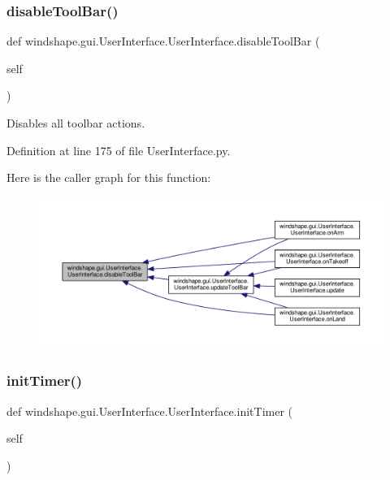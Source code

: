 \subsubsection{\texorpdfstring{disable\+Tool\+Bar()}{disableToolBar()}}
{\footnotesize\ttfamily def windshape.\+gui.\+User\+Interface.\+User\+Interface.\+disable\+Tool\+Bar (\begin{DoxyParamCaption}\item[{}]{self }\end{DoxyParamCaption})}

\begin{DoxyVerb}Disables all toolbar actions.\end{DoxyVerb}
 

Definition at line 175 of file User\+Interface.\+py.

Here is the caller graph for this function\+:\nopagebreak
\begin{figure}[H]
\begin{center}
\leavevmode
\includegraphics[width=350pt]{classwindshape_1_1gui_1_1_user_interface_1_1_user_interface_ad4c1713ba509549d24a75703fbeb6e0c_icgraph}
\end{center}
\end{figure}
\mbox{\label{classwindshape_1_1gui_1_1_user_interface_1_1_user_interface_aab0faeeb75c1efe046255209aff5663c}} 
\subsubsection{\texorpdfstring{init\+Timer()}{initTimer()}}
{\footnotesize\ttfamily def windshape.\+gui.\+User\+Interface.\+User\+Interface.\+init\+Timer (\begin{DoxyParamCaption}\item[{}]{self }\end{DoxyParamCaption})}

